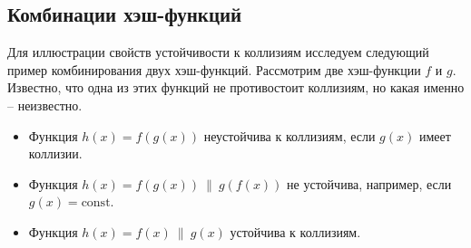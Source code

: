 \subsection{Комбинации хэш-функций}

Для иллюстрации свойств устойчивости к коллизиям исследуем следующий пример комбинирования двух хэш-функций. Рассмотрим две хэш-функции $f$ и $g$. Известно, что одна из этих функций не противостоит коллизиям, но какая именно -- неизвестно.
\begin{itemize}
    \item Функция $h(x) = f(g(x))$ неустойчива к коллизиям, если $g(x)$ имеет коллизии.
    \item Функция $h(x) = f(g(x)) ~\|~ g(f(x))$ не устойчива, например, если $g(x) = \textrm{const}$.
    \item Функция $h(x) = f(x) ~\|~ g(x)$ устойчива к коллизиям.
\end{itemize}
